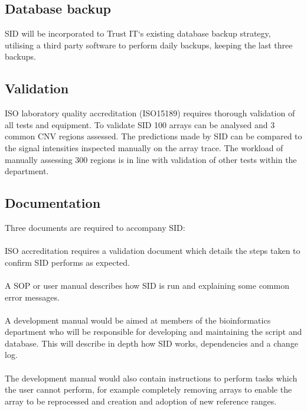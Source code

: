 \subsection{Database backup}
SID will be incorporated to Trust IT`s existing database backup strategy, utilising a third party software to perform daily backups, keeping the last three backups. 

\subsection{Validation}
ISO laboratory quality accreditation (ISO15189) requires thorough validation of all tests and equipment. To validate SID 100 arrays can be analysed and 3 common CNV regions assessed. The predictions made by SID can be compared to the signal intensities inspected manually on the array trace. The workload of manually assessing 300 regions is in line with validation of other tests within the department.

\subsection{Documentation}
Three documents are required to accompany SID:
\paragraph*{}
ISO accreditation requires a validation document which details the steps taken to confirm SID performs as expected.
\paragraph*{}
A SOP or user manual describes how SID is run and explaining some common error messages.
\paragraph*{}
A development manual would be aimed at members of the bioinformatics department who will be responsible for developing and maintaining the script and database. This will describe in depth how SID works, dependencies and a change log. 
\paragraph*{}
The development manual would also contain instructions to perform tasks which the user cannot perform, for example completely removing arrays to enable the array to be reprocessed and creation and adoption of new reference ranges.
